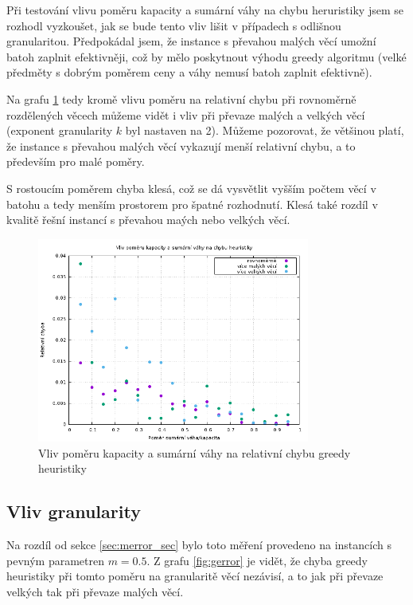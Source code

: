 \documentclass[11pt]{article}
\begin{document}
Při testování vlivu poměru kapacity a sumární váhy na chybu heruristiky jsem se rozhodl vyzkoušet, jak se bude tento vliv lišit v případech s odlišnou granularitou. Předpokádal jsem, že instance s převahou malých věcí umožní batoh zaplnit efektivněji, což by mělo poskytnout výhodu greedy algoritmu (velké předměty s dobrým poměrem ceny a váhy nemusí batoh zaplnit efektivně).

Na grafu \ref{fig:merror} tedy kromě vlivu poměru na relativní chybu při rovnoměrně rozdělených věcech můžeme vidět i vliv při převaze malých a velkých věcí (exponent granularity $k$ byl nastaven na 2). Můžeme pozorovat, že většinou platí, že instance s převahou malých věcí vykazují menší relativní chybu, a to především pro malé poměry. 

S rostoucím poměrem chyba klesá, což se dá vysvětlit vyšším počtem věcí v batohu a tedy menším prostorem pro špatné rozhodnutí. Klesá také rozdíl v kvalitě řešní instancí s převahou maých nebo velkých věcí.

\begin{figure}[h!]
	\centering
    	\includegraphics[width=0.8\textwidth]{../data/merror.png}
	\caption{Vliv poměru kapacity a sumární váhy na relativní chybu greedy heuristiky}
	\label{fig:merror}
\end{figure}

\subsection{Vliv granularity}

Na rozdíl od sekce \ref{sec:merror_sec} bylo toto měření provedeno na instancích s pevným parametren $m = 0.5$.
Z grafu \ref{fig:gerror} je vidět, že chyba greedy heuristiky při tomto poměru na granularitě věcí nezávisí, a to jak při převaze velkých tak při převaze malých věcí.
\end{document}
